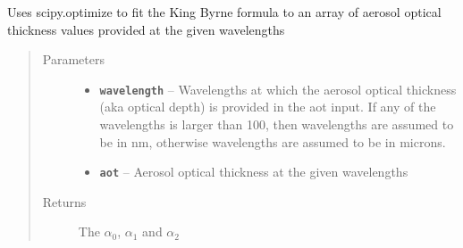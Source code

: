 \documentclass[a4paper,10pt,english]{sphinxmanual}
\begin{document}
\begin{fulllineitems}
\label{packages:librad.king_byrne_formula_fit}
Uses scipy.optimize to fit the King Byrne formula to an array of aerosol optical thickness values
provided at the given wavelengths
\begin{quote}\begin{description}
\item[{Parameters}] \leavevmode\begin{itemize}
\item {} 
\textbf{\texttt{wavelength}} -- Wavelengths at which the aerosol optical thickness (aka optical depth) is provided in the aot
input. If any of the wavelengths is larger than 100, then wavelengths are assumed to be in nm, otherwise
wavelengths are assumed to be in microns.

\item {} 
\textbf{\texttt{aot}} -- Aerosol optical thickness at the given wavelengths

\end{itemize}

\item[{Returns}] \leavevmode
The \(\alpha_0\), \(\alpha_1\) and \(\alpha_2\)

\end{description}\end{quote}

\end{fulllineitems}

\end{document}
